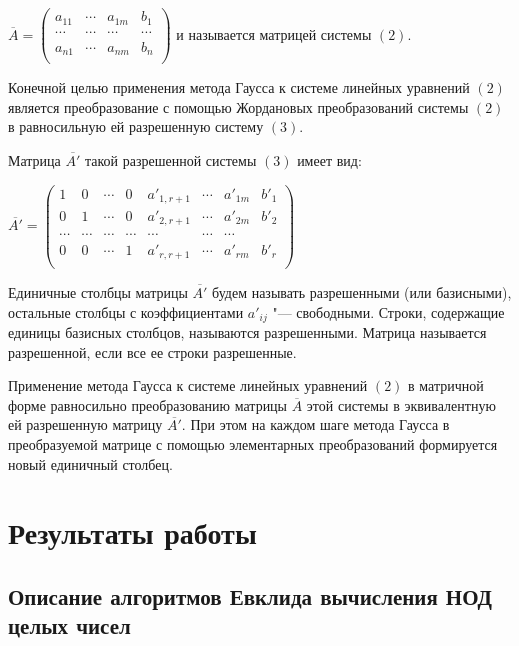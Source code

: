 \documentclass[bachelor, och, labwork]{SCWorks}
\begin{document}
        $ \overline{A} =
        \begin{pmatrix}
            a_{11} & \cdots & a_{1m} & b_1 \\
            \cdots & \cdots & \cdots & \cdots \\
            a_{n1} & \cdots & a_{nm} & b_n \\
        \end{pmatrix}
        $ и называется матрицей системы $(2)$.

        Конечной целью применения метода Гаусса к системе линейных уравнений
        $(2)$ является преобразование с помощью Жордановых преобразований
        системы $(2)$ в равносильную ей разрешенную систему $(3)$.

        Матрица $\overline{A'}$ такой разрешенной системы $(3)$ имеет вид:

        $ \overline{A'} =
        \begin{pmatrix}
            1 & 0 & \cdots & 0 & a'_{1,r+1} & \cdots & a'_{1m} & b'_1 \\
            0 & 1 & \cdots & 0 & a'_{2,r+1} & \cdots & a'_{2m} & b'_2 \\
            \cdots & \cdots & \cdots & \cdots & \cdots & \cdots & \cdots \\
            0 & 0 & \cdots & 1 & a'_{r,r+1} & \cdots & a'_{rm} & b'_r \\
        \end{pmatrix}
        $

        Единичные столбцы матрицы $\overline{A'}$ будем называть разрешенными
        (или базисными), остальные столбцы с коэффициентами $a'_{ij}$ "---
        свободными. Строки, содержащие единицы базисных столбцов, называются
        разрешенными. Матрица называется разрешенной, если все ее строки
        разрешенные.

        Применение метода Гаусса к системе линейных уравнений $(2)$ в матричной
        форме равносильно преобразованию матрицы $\overline{A}$ этой системы в
        эквивалентную ей разрешенную матрицу $\overline{A'}$. При этом на каждом
        шаге метода Гаусса в преобразуемой матрице с помощью элементарных
        преобразований формируется новый единичный столбец.

\section{Результаты работы}
    \subsection{Описание алгоритмов Евклида вычисления НОД целых чисел}
\end{document}
